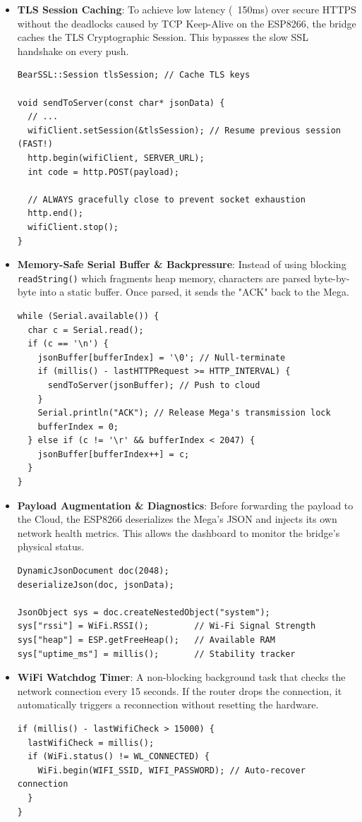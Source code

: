 \documentclass[12pt,a4paper]{article}
\newcommand{\Q}[1]{\textcolor{questioncolor}{\textbf{#1}}}
\begin{document}
\begin{itemize}
    \item \Q{TLS Session Caching}:
    To achieve low latency (~150ms) over secure HTTPS without the deadlocks caused by TCP Keep-Alive on the ESP8266, the bridge caches the TLS Cryptographic Session. This bypasses the slow SSL handshake on every push.
\begin{verbatim}
BearSSL::Session tlsSession; // Cache TLS keys

void sendToServer(const char* jsonData) {
  // ...
  wifiClient.setSession(&tlsSession); // Resume previous session (FAST!)
  http.begin(wifiClient, SERVER_URL);
  int code = http.POST(payload);
  
  // ALWAYS gracefully close to prevent socket exhaustion
  http.end();
  wifiClient.stop(); 
}
\end{verbatim}

    \item \Q{Memory-Safe Serial Buffer \& Backpressure}:
    Instead of using blocking \texttt{readString()} which fragments heap memory, characters are parsed byte-by-byte into a static buffer. Once parsed, it sends the "ACK" back to the Mega.
\begin{verbatim}
while (Serial.available()) {
  char c = Serial.read();
  if (c == '\n') {
    jsonBuffer[bufferIndex] = '\0'; // Null-terminate
    if (millis() - lastHTTPRequest >= HTTP_INTERVAL) {
      sendToServer(jsonBuffer); // Push to cloud
    }
    Serial.println("ACK"); // Release Mega's transmission lock
    bufferIndex = 0;
  } else if (c != '\r' && bufferIndex < 2047) {
    jsonBuffer[bufferIndex++] = c;
  }
}
\end{verbatim}
    \item \Q{Payload Augmentation \& Diagnostics}:
    Before forwarding the payload to the Cloud, the ESP8266 deserializes the Mega's JSON and injects its own network health metrics. This allows the dashboard to monitor the bridge's physical status.
\begin{verbatim}
DynamicJsonDocument doc(2048);
deserializeJson(doc, jsonData);

JsonObject sys = doc.createNestedObject("system");
sys["rssi"] = WiFi.RSSI();         // Wi-Fi Signal Strength
sys["heap"] = ESP.getFreeHeap();   // Available RAM
sys["uptime_ms"] = millis();       // Stability tracker
\end{verbatim}

    \item \Q{WiFi Watchdog Timer}:
    A non-blocking background task that checks the network connection every 15 seconds. If the router drops the connection, it automatically triggers a reconnection without resetting the hardware.
\begin{verbatim}
if (millis() - lastWifiCheck > 15000) {
  lastWifiCheck = millis();
  if (WiFi.status() != WL_CONNECTED) {
    WiFi.begin(WIFI_SSID, WIFI_PASSWORD); // Auto-recover connection
  }
}
\end{verbatim}
\end{itemize}
\end{document}

